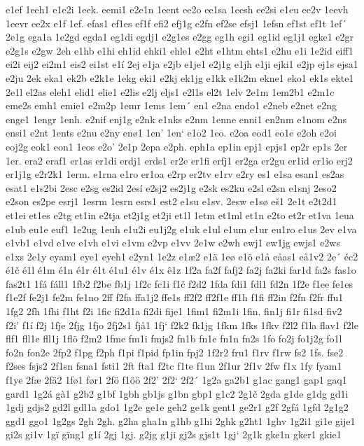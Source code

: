e1ef
1eeh1
e1e2i
1eek.
eemi1
e2e1n
1eent
ee2o
ee1sa
1eesh
ee2si
e1eu
ee2v
1eevh
1eevr
ee2x
e1f
1ef.
efas1
ef1es
ef1f
efi2
efj1g
e2fn
ef2se
efsj1
1efsn
ef1st
ef1t
1ef´
2e1g
ega1a
1e2gd
egda1
eg1di
egdj1
e2g1es
e2gg
eg1h
egi1
eg1id
eg1j1
egke1
e2gr
e2g1s
e2gw
2eh
e1hb
e1hi
eh1id
ehki1
ehle1
e2ht
e1htm
ehts1
e2hu
e1i
1e2id
eiff1
ei2i
eij2
ei2m1
eis2
ei1st
e1í
2ej
e1ja
e2jb
e1je1
e2j1g
e1jh
e1ji
ejki1
e2jp
ej1s
ejsa1
e2ju
2ek
eka1
ek2b
e2k1e
1ekg
eki1
e2kj
ek1jg
e1kk
e1k2m
ekne1
eko1
ek1s
ekte1
2e1l
el2as
eleh1
elid1
elie1
e2lis
e2lj
eljs1
e2l1s
el2t
1elv
2e1m
1em2b1
e2m1c
eme2s
emh1
emie1
e2m2p
1emr
1ems
1em´
en1
e2na
endo1
e2neb
e2net
e2ng
enge1
1engr
1enh.
e2nif
enj1g
e2nk
e1nks
e2nm
1enne
enni1
en2nm
e1nom
e2ns
ensi1
e2nt
1ents
e2nu
e2ny
enø1
1en'
1en`
e1o2
1eo.
e2oa
eod1
eo1e
e2oh
e2oi
eoj2g
eok1
eon1
1eos
e2o'
2e1p
2epa
e2ph.
eph1a
ep1in
epj1
epjs1
ep2r
ep1s
2er
1er.
era2
eraf1
er1as
er1di
erdj1
erds1
er2e
er1fi
erfj1
er2ga
er2gu
er1id
er1io
erj2
er1j1g
e2r2k1
1erm.
e1rna
e1ro
er1oa
e2rp
er2tv
e1rv
e2ry
es1
e1sa
esan1
es2as
esat1
e1s2bi
2esc
e2sg
es2id
2esí
e2sj2
es2j1g
e2sk
es2ku
e2sl
e2sn
e1snj
2eso2
e2son
es2pe
esrj1
1esrm
1esrn
esrs1
est2
e1su
e1sv.
2esw
e1sø
eš1
2e1t
e2t2d1
et1ei
et1es
e2tg
et1in
e2tja
et2j1g
et2ji
et1l
1etm
et1ml
et1n
e2to
et2r
et1va
1eua
e1ub
eu1e
euf1
1e2ug
1euh
e1u2i
eu1j2g
e1uk
e1ul
e1um
e1ur
eu1ro
e1us
2ev
e1va
e1vb1
e1vd
e1ve
e1vh
e1vi
e1vm
e2vp
e1vv
2e1w
e2wh
ewj1
ew1jg
ewjs1
e2ws
e1xs
2e1y
eyam1
eye1
eyeh1
e2yn1
1e2z
e1æ2
e1ä
1eø
e1ö
e1å
eåas1
eå1v2
2e´
éc2
é1č
é1l
é1m
é1n
é1r
é1t
é1u1
é1v
é1x
ê1z
1f2a
fa2f
fafj2
fa2j
fa2ki
far1d
fa2s
fas1o
fas2t1
1fá
fáll1
1fb2
f2be
fb1j
1f2c
fc1i
f1č
f2d2
1fda
fdi1
fdl1
fd2n
1f2e
f1ee
fe1es
f1e2f
fe2j1
fe2m
fe1no
2ff
f2fa
ffa1j2
ffe1s
ff2f2
ff2f1e
ff1h
f1fi
ff2in
f2fn
f2fr
ffu1
1fg2
2fh
1fhi
f1ht
f2i
1fic
fi2d1a
fi2di
fije1
1fim1
fi2m1i
1fin.
fin1j
fi1r
fi1sd
fiv2
f2i'
f1í
f2j
1fje
2fjg
1fjo
2fj2s1
fjå1
1fj`
f2k2
fk1jg
1fkm
1fks
1fkv
f2l2
f1la
flav1
f2le
flf1
fll1e
fll1j
1flö
f2m2
1fme
fm1i
fmjs2
fn1b
fn1e
fn1n
fn2s
1fo
fo2j
fo1j2g
fo1l
fo2n
fon2e
2fp2
f1pg
f2ph
f1pi
f1pid
fp1in
fpj2
1f2r2
fru1
f1rv
f1rw
fs2
1fs.
fse2
f2ses
fsjs2
2f1sn
fsna1
fsti1
2ft
fta1
f2tc
f1te
f1un
2f1ur
2f1v
2fw
f1x
1fy
fyam1
f1ye
2fæ
2fä2
1fø1
før1
2fö
f1öö
2f2'
2f2`
2f2´
1g2a
ga2b1
g1ac
gang1
gap1
gaq1
gard1
1g2á
gà1
g2b2
g1bf
1gbh
gb1js
g1bn
gbp1
g1c2
2g1č
2gda
g1de
g1dg
gd1i
1gdj
gdjs2
gd2l
gdl1a
gdo1
1g2e
ge1e
geh2
ge1k
gent1
ge2r1
g2f
2gfá
1gfd
2g1g2
ggd1
ggo1
1g2gs
2gh
2gh.
g2ha
gha1n
g1hb
g1hi
2ghk
g2ht1
1ghv
1g2i1
gi1e
gije1
gi2s
gi1v
1gï
gïng1
g1í
2gj
1gj.
g2jg
g1ji
gj2s
gjs1t
1gj`
2g1k
gke1n
gker1
gkie1
